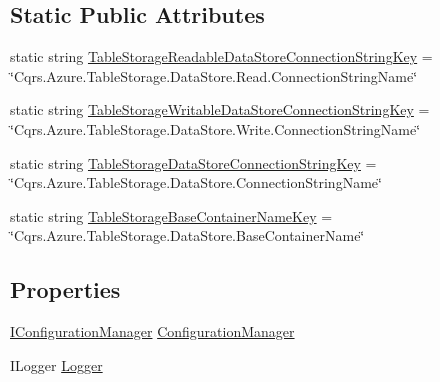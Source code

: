 \subsection*{Static Public Attributes}
\begin{DoxyCompactItemize}
\item 
static string \hyperlink{classCqrs_1_1Azure_1_1BlobStorage_1_1DataStores_1_1TableStorageDataStoreConnectionStringFactory_a412f1d16816e56fa15437a81d5066743}{Table\+Storage\+Readable\+Data\+Store\+Connection\+String\+Key} = \char`\"{}Cqrs.\+Azure.\+Table\+Storage.\+Data\+Store.\+Read.\+Connection\+String\+Name\char`\"{}
\item 
static string \hyperlink{classCqrs_1_1Azure_1_1BlobStorage_1_1DataStores_1_1TableStorageDataStoreConnectionStringFactory_ac771ba92adc2e14d7ef49bb3f25ab001}{Table\+Storage\+Writable\+Data\+Store\+Connection\+String\+Key} = \char`\"{}Cqrs.\+Azure.\+Table\+Storage.\+Data\+Store.\+Write.\+Connection\+String\+Name\char`\"{}
\item 
static string \hyperlink{classCqrs_1_1Azure_1_1BlobStorage_1_1DataStores_1_1TableStorageDataStoreConnectionStringFactory_a386384728fd8f31bee01a6e960ac53d8}{Table\+Storage\+Data\+Store\+Connection\+String\+Key} = \char`\"{}Cqrs.\+Azure.\+Table\+Storage.\+Data\+Store.\+Connection\+String\+Name\char`\"{}
\item 
static string \hyperlink{classCqrs_1_1Azure_1_1BlobStorage_1_1DataStores_1_1TableStorageDataStoreConnectionStringFactory_aee2a11919d6038a8b7829a53483ea18a}{Table\+Storage\+Base\+Container\+Name\+Key} = \char`\"{}Cqrs.\+Azure.\+Table\+Storage.\+Data\+Store.\+Base\+Container\+Name\char`\"{}
\end{DoxyCompactItemize}
\subsection*{Properties}
\begin{DoxyCompactItemize}
\item 
\hyperlink{interfaceCqrs_1_1Configuration_1_1IConfigurationManager}{I\+Configuration\+Manager} \hyperlink{classCqrs_1_1Azure_1_1BlobStorage_1_1DataStores_1_1TableStorageDataStoreConnectionStringFactory_ae1dca1e7f76fb10ebfec03dbae0c04b7}{Configuration\+Manager}
\item 
I\+Logger \hyperlink{classCqrs_1_1Azure_1_1BlobStorage_1_1DataStores_1_1TableStorageDataStoreConnectionStringFactory_a4a5a76b15fdc14b23c3ca11becf03ee9}{Logger}
\end{DoxyCompactItemize}


